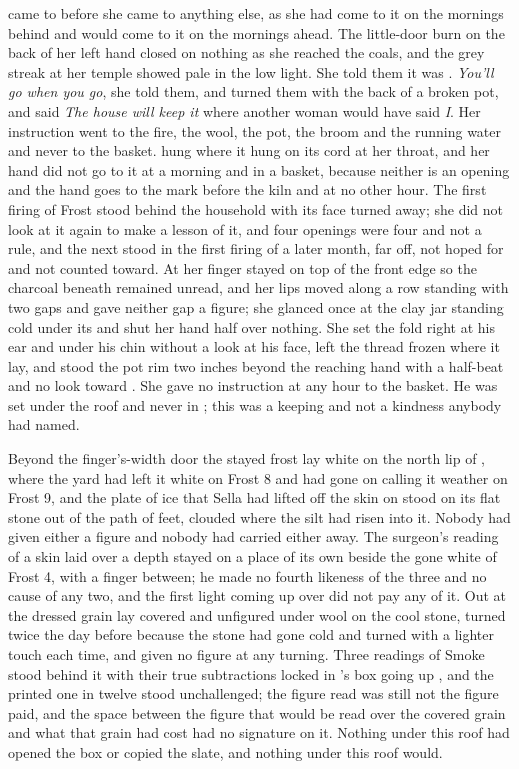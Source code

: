  came to  before she came to anything else, as she had come to it on the mornings behind and would come to it on the mornings ahead. The little-door burn on the back of her left hand closed on nothing as she reached the coals, and the grey streak at her temple showed pale in the low light. She told them it was . \emph{You'll go when you go}, she told them, and turned them with the back of a broken pot, and said \emph{The house will keep it} where another woman would have said \emph{I}. Her instruction went to the fire, the wool, the pot, the broom and the running water and never to the basket.  hung where it hung on its cord at her throat, and her hand did not go to it at a morning and in a basket, because neither is an opening and the hand goes to the mark before the kiln and at no other hour. The first firing of Frost stood behind the household with its face turned away; she did not look at it again to make a lesson of it, and four openings were four and not a rule, and the next stood in the first firing of a later month, far off, not hoped for and not counted toward. At  her finger stayed on top of the front edge so the charcoal beneath remained unread, and her lips moved along a row standing with two gaps and gave neither gap a figure; she glanced once at the clay jar standing cold under its  and shut her hand half over nothing. She set the fold right at his ear and under his chin without a look at his face, left the thread frozen where it lay, and stood the pot rim two inches beyond the reaching hand with a half-beat and no look toward . She gave no instruction at any hour to the basket. He was set under the roof and never in ; this was a keeping and not a kindness anybody had named.

Beyond the finger's-width door the stayed frost lay white on the north lip of , where the yard had left it white on Frost 8 and had gone on calling it weather on Frost 9, and the plate of ice that Sella had lifted off the skin on  stood on its flat stone out of the path of feet, clouded where the silt had risen into it. Nobody had given either a figure and nobody had carried either away. The surgeon's reading of a skin laid over a depth stayed on a place of its own beside the gone white of Frost 4, with a finger between; he made no fourth likeness of the three and no cause of any two, and the first light coming up over  did not pay any of it. Out at  the dressed grain lay covered and unfigured under wool on the cool stone, turned twice the day before because the stone had gone cold and turned with a lighter touch each time, and given no figure at any turning. Three readings of Smoke stood behind it with their true subtractions locked in 's box going up , and the printed one in twelve stood unchallenged; the figure read was still not the figure paid, and the space between the figure that would be read over the covered grain and what that grain had cost had no signature on it. Nothing under this roof had opened the box or copied the slate, and nothing under this roof would.

